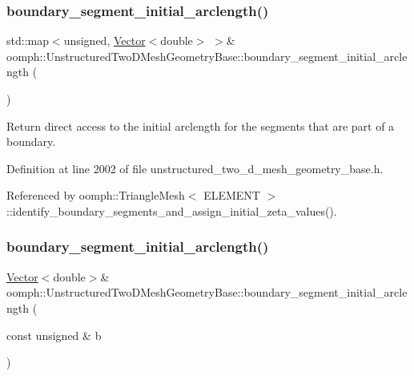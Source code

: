 \subsubsection{\texorpdfstring{boundary\+\_\+segment\+\_\+initial\+\_\+arclength()}{boundary\_segment\_initial\_arclength()}\hspace{0.1cm}{\footnotesize\ttfamily [1/2]}}
{\footnotesize\ttfamily std\+::map$<$unsigned, \hyperlink{classoomph_1_1Vector}{Vector}$<$double$>$ $>$\& oomph\+::\+Unstructured\+Two\+D\+Mesh\+Geometry\+Base\+::boundary\+\_\+segment\+\_\+initial\+\_\+arclength (\begin{DoxyParamCaption}{ }\end{DoxyParamCaption})\hspace{0.3cm}{\ttfamily [inline]}}



Return direct access to the initial arclength for the segments that are part of a boundary. 



Definition at line 2002 of file unstructured\+\_\+two\+\_\+d\+\_\+mesh\+\_\+geometry\+\_\+base.\+h.



Referenced by oomph\+::\+Triangle\+Mesh$<$ E\+L\+E\+M\+E\+N\+T $>$\+::identify\+\_\+boundary\+\_\+segments\+\_\+and\+\_\+assign\+\_\+initial\+\_\+zeta\+\_\+values().

\mbox{\label{classoomph_1_1UnstructuredTwoDMeshGeometryBase_a46f0b2d486e0610acebc5eb17bc9dea0}} 
\subsubsection{\texorpdfstring{boundary\+\_\+segment\+\_\+initial\+\_\+arclength()}{boundary\_segment\_initial\_arclength()}\hspace{0.1cm}{\footnotesize\ttfamily [2/2]}}
{\footnotesize\ttfamily \hyperlink{classoomph_1_1Vector}{Vector}$<$double$>$\& oomph\+::\+Unstructured\+Two\+D\+Mesh\+Geometry\+Base\+::boundary\+\_\+segment\+\_\+initial\+\_\+arclength (\begin{DoxyParamCaption}\item[{const unsigned \&}]{b }\end{DoxyParamCaption})\hspace{0.3cm}{\ttfamily [inline]}}



